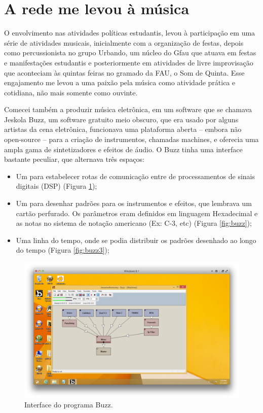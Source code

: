 \section{A rede me levou à música}
O envolvimento nas atividades políticas estudantis, levou à participação em uma série de atividades musicais, inicialmente com a organização de festas, depois como percussionista no grupo Urbando, um núcleo do Gfau que atuava em festas e manifestações estudantis e posteriormente em atividades de livre improvisação que aconteciam às quintas feiras no gramado da FAU, o Som de Quinta. Esse engajamento me levou a uma paixão pela música como atividade prática e cotidiana, não mais somente como ouvinte. 

Comecei também a produzir música eletrônica, em um software que se chamava Jeskola Buzz, um software gratuito meio obscuro, que era usado por alguns artistas da cena eletrônica, funcionava uma plataforma aberta – embora não open-source – para a criação de instrumentos, chamadas machines, e oferecia uma ampla gama de sintetizadores e efeitos de áudio. O Buzz tinha uma interface bastante peculiar, que alternava três espaços:

\begin{itemize}
\item Um para estabelecer rotas de comunicação entre de processamentos de sinais digitais (DSP) (Figura \ref{fig:buzz1});
\item Um para desenhar padrões para os instrumentos e efeitos, que lembrava um cartão perfurado. Os parâmetros eram definidos em linguagem Hexadecimal e as notas no sistema de notação americano (Ex: C-3, etc) (Figura \ref{fig:buzz});
\item Uma linha do tempo, onde se podia distribuir os padrões desenhado ao longo do tempo (Figura \ref{fig:buzz3});
\end{itemize}

\begin{figure}
\centering
\includegraphics[width=1\textwidth]{pictures/cap1/buzz1}
\caption{Interface do programa Buzz.}
\label{fig:buzz1}
\end{figure}

